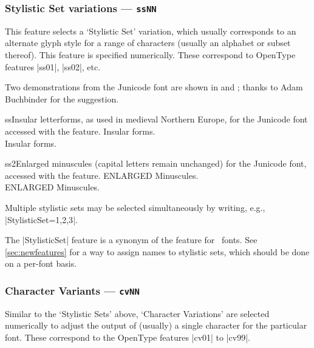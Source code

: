 \documentclass[a4paper]{l3doc}
\begin{document}
\subsubsection{Stylistic Set variations --- \texttt{ssNN}}

This feature selects a `Stylistic Set' variation,
which usually corresponds to an alternate glyph style for a range of
characters (usually an alphabet or subset thereof).
This feature is specified numerically. These correspond to OpenType
features |ss01|, |ss02|, etc.

Two demonstrations from the Junicode
font
are shown in  and ; thanks to Adam
Buchbinder for the suggestion.

\begin{Lexample}{ss}{Insular letterforms, as used in medieval Northern Europe, for the Junicode font accessed with the  feature.}
   Insular forms. \\
   Insular forms. \\
\end{Lexample}

\begin{Lexample}{ss2}{Enlarged minuscules (capital letters remain unchanged) for the Junicode font, accessed with the  feature.}
   ENLARGED Minuscules. \\
   ENLARGED Minuscules. \\
\end{Lexample}

Multiple stylistic sets may be selected simultaneously by writing, e.g.,
|StylisticSet={1,2,3}|.

The |StylisticSet| feature is a synonym of the  feature for \AAT\ fonts.
See \vref{sec:newfeatures} for a way to assign names to stylistic sets, which should be done on a per-font basis.

\subsubsection{Character Variants --- \texttt{cvNN}}

Similar to the `Stylistic Sets' above, `Character Variations' are selected
numerically to adjust the output of (usually) a single character for the
particular font. These correspond to the OpenType features |cv01| to |cv99|.
\end{document}
